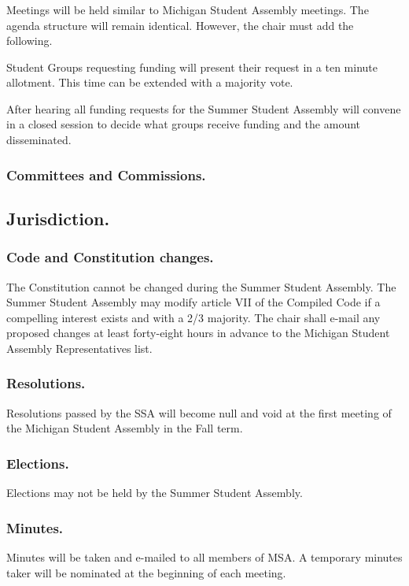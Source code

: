 \subsubsection{}
Meetings will be held similar to Michigan Student Assembly meetings. The agenda structure will remain identical. However, the chair must add the following.

 Student Groups requesting funding will present their request in a ten minute allotment. This time can be extended with a majority vote.

After hearing all funding requests for the Summer Student Assembly will convene in a closed session to decide what groups receive funding and the amount disseminated.


\subsubsection{Committees and Commissions.}


\subsection{Jurisdiction.}

\subsubsection{Code and Constitution changes.}
The Constitution cannot be changed during the Summer Student Assembly.  The Summer Student Assembly may modify article VII of the Compiled Code if a compelling interest exists and with a 2/3 majority.  The chair shall e-mail any proposed changes at least forty-eight hours in advance to the Michigan Student Assembly Representatives list.

\subsubsection{Resolutions.}
Resolutions passed by the SSA will become null and void at the first meeting of the Michigan Student Assembly in the Fall term.

\subsubsection{Elections.}
Elections may not be held by the Summer Student Assembly.

\subsubsection{Minutes.}
Minutes will be taken and e-mailed to all members of MSA. A temporary minutes taker will be nominated at the beginning of each meeting.


